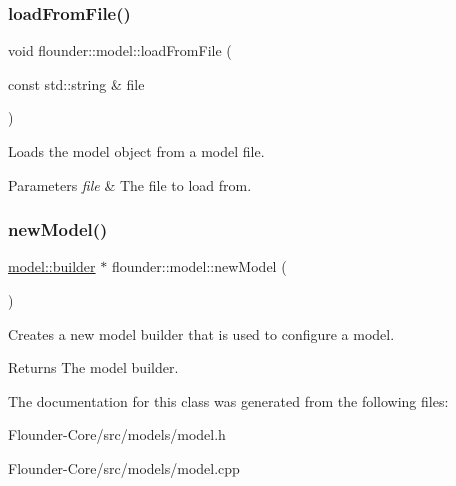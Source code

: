 \subsubsection{\texorpdfstring{load\+From\+File()}{loadFromFile()}}
{\footnotesize\ttfamily void flounder\+::model\+::load\+From\+File (\begin{DoxyParamCaption}\item[{const std\+::string \&}]{file }\end{DoxyParamCaption})\hspace{0.3cm}{\ttfamily [private]}}



Loads the model object from a model file. 


\begin{DoxyParams}{Parameters}
{\em file} & The file to load from. \\
\hline
\end{DoxyParams}
\mbox{\label{classflounder_1_1model_a55bec80a4092dbe35c319c49d1d50ed8}} 
\subsubsection{\texorpdfstring{new\+Model()}{newModel()}}
{\footnotesize\ttfamily \hyperlink{classflounder_1_1model_1_1builder}{model\+::builder} $\ast$ flounder\+::model\+::new\+Model (\begin{DoxyParamCaption}{ }\end{DoxyParamCaption})\hspace{0.3cm}{\ttfamily [static]}}



Creates a new model builder that is used to configure a model. 

\begin{DoxyReturn}{Returns}
The model builder. 
\end{DoxyReturn}


The documentation for this class was generated from the following files\+:\begin{DoxyCompactItemize}
\item 
Flounder-\/\+Core/src/models/model.\+h\item 
Flounder-\/\+Core/src/models/model.\+cpp\end{DoxyCompactItemize}
